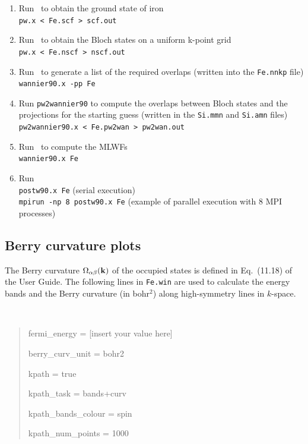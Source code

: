 \documentclass[a4paper,11pt,twoside]{article}
\begin{document}
\begin{enumerate}
\item Run \pwscf\ to obtain the ground state of iron\\
{\tt pw.x < Fe.scf > scf.out}

\item Run \pwscf\ to obtain the Bloch states on a uniform k-point
  grid\\ 
{\tt pw.x < Fe.nscf > nscf.out}

\item Run \wannier\ to generate a list of the required overlaps (written
  into the {\tt Fe.nnkp} file)\\
{\tt wannier90.x -pp Fe}

\item Run {\tt pw2wannier90} to compute the overlaps between Bloch
  states and the projections for the starting guess (written in the
  {\tt Si.mmn} and {\tt  Si.amn} files)\\
{\tt pw2wannier90.x < Fe.pw2wan > pw2wan.out}

\item Run \wannier\ to compute the MLWFs\\
{\tt wannier90.x Fe}

\item Run \postw\ \\
  {\tt postw90.x Fe} (serial execution)\\
  {\tt mpirun -np 8 postw90.x Fe} (example of parallel execution with
  8 MPI processes) 

\end{enumerate}

\subsection*{Berry curvature plots}

The Berry curvature $\Omega_{\alpha\beta}({\bf k})$ of the occupied
states is defined in Eq.~(11.18) of the User Guide.  The following
lines in {\tt Fe.win} are used to calculate the energy bands and the
Berry curvature (in bohr$^2$) along high-symmetry lines in $k$-space.
{\tt
\begin{quote}
fermi\_energy = [insert your value here] 

berry\_curv\_unit = bohr2

kpath = true

kpath\_task = bands+curv

kpath\_bands\_colour = spin

kpath\_num\_points = 1000
\end{quote} }
\end{document}
